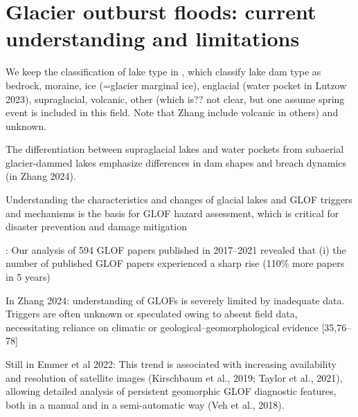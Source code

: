 

\section{Glacier outburst floods: current understanding and limitations} %

We keep the classification of lake type in \cite{Lutzow&al2023, Zhang&al2024}, which classify lake dam type as bedrock, moraine, ice (=glacier marginal ice), englacial (water pocket in Lutzow 2023), supraglacial, volcanic, other (which is?? not clear, but one assume spring event is included in this field. Note that Zhang include volcanic in others) and unknown.

The differentiation between supraglacial lakes and water pockets from subaerial glacier-dammed lakes emphasize differences in dam shapes and breach dynamics (in Zhang 2024).

Understanding the characteristics and changes of glacial lakes and GLOF triggers and mechanisms is the basis for GLOF hazard assessment,
which is critical for disaster prevention and damage mitigation

\citet{Emmer&al2022}: Our analysis of 594 GLOF papers published in 2017–2021 revealed that (i) the number of published GLOF papers experienced a sharp rise (110\% more papers in 5 years)

In Zhang 2024: understanding of GLOFs is severely limited by inadequate data. Triggers are often unknown or speculated owing to absent field data, necessitating reliance on climatic or geological–geomorphological evidence [35,76–78]





Still in Emmer et al 2022: This trend is associated with increasing availability and resolution of satellite images (Kirschbaum et al., 2019; Taylor et al., 2021), allowing detailed analysis of persistent geomorphic GLOF diagnostic features, both in a manual and in a semi-automatic way (Veh et al., 2018).

